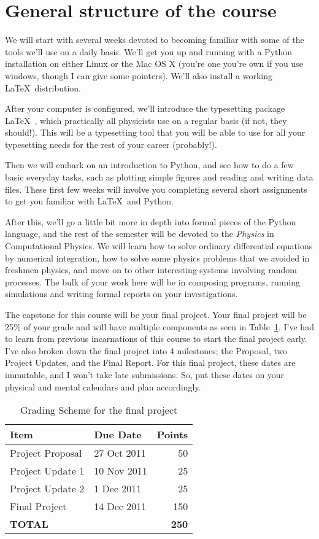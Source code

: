 \documentclass[justified]{tufte-handout}
\begin{document}
\section{General structure of the course}
We will start with several weeks devoted to becoming familiar with some of the tools we'll use on a daily basis. We'll get you up and running with a Python installation on either Linux or the Mac OS X (you're one you're own if you use windows, though I can give some pointers). We'll also install a working \LaTeX\ distribution. 

After your computer is configured, we'll introduce the typesetting package \LaTeX\ , which practically all physicists use on a regular basis (if not, they should!). This will be a typesetting tool that you will be able to use for all your typesetting needs for the rest of your career (probably!). 

Then we will embark on an introduction to Python, and see how to do a few basic everyday tasks, such as plotting simple figures and reading and writing data files. These first few weeks will involve you completing several short assignments to get you familiar with \LaTeX\ and Python. 

After this, we'll go a little bit more in depth into formal pieces of the Python language, and the rest of the semester will be devoted to the \textit{Physics} in Computational Physics. We will learn how to solve ordinary differential equations by numerical integration, how to solve some physics problems that we avoided in freshmen physics, and move on to other interesting systems involving random processes. The bulk of your work here will be in composing programs, running simulations and writing formal reports on your investigations. 

The capstone for this course will be your final project. Your final project will be 25\% of your grade and will have multiple components as seen in Table~\ref{tab:finalProject}. I've had to learn from previous incarnations of this course to start the final project early. I've also broken down the final project into 4 milestones; the Proposal, two Project Updates, and the Final Report. For this final project, these dates are immutable, and I won't take late submissions. So, put these dates on your physical and mental calendars and plan accordingly. \\
\begin{table}[h]
  \centering
  \selectfont
  \begin{tabular}{llr}
    \toprule
    Item &  Due Date & Points\\
    \midrule
    Project Proposal & 27 Oct 2011 & 50 \\
    Project Update 1 & 10 Nov 2011 & 25 \\
    Project Update 2  & 1 Dec 2011 & 25\\
    Final Project & 14 Dec 2011 &  150\\
    {\bf TOTAL} & &  {\bf 250} \\
    \bottomrule
  \end{tabular}
  \caption{Grading Scheme for the final project}
  \label{tab:finalProject}
\end{table}
\end{document}
